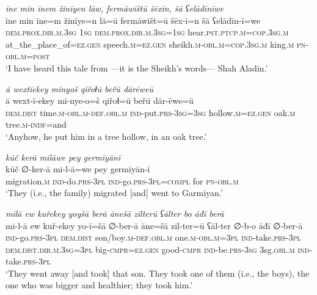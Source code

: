 \ea \label{ZB.37}
\textit{īne min īnem žinīyen lāw, fermāwištū šēxīn, šā ʕelādīnīwe} \\ 
\gll īne min īne=m žinīye=n lā=ū fermāwišt=ū šēx-ī=n šā ʕelādīn-ī=we \\ 
 \textsc{dem.prox}\textsc{.dir}\textsc{.m}\textsc{.3sg} \textsc{1sg} \textsc{dem.prox}\textsc{.dir}\textsc{.m}\textsc{.3sg}\textsc{=\textsc{1sg}} hear\textsc{.pst}\textsc{.ptcp}\textsc{.m}\textsc{=cop}\textsc{.3sg}\textsc{.m} at\_the\_place\_of\textsc{\textsc{=ez.gen}} speech\textsc{.m}\textsc{\textsc{=ez.gen}} sheikh\textsc{.m}\textsc{-obl}\textsc{.m}\textsc{=cop}\textsc{.3sg}\textsc{.m} king\textsc{.m} \textsc{pn}\textsc{-obl}\textsc{.m}\textsc{=\textsc{post}} \\ 
\glt `I have heard this tale from —it is the Sheikh’s words— Shah Aladin.'
\z 
 
\ea \label{ZB.38}
\textit{ā wextīekey minyoš qiřoɫū beřū dārēweū} \\ 
\gll ā wext-ī-ekey mi-nye-o=š qiřoɫ=ū beřū dār-ēwe=ū \\ 
 \textsc{dem.dist} time\textsc{.m}\textsc{-obl}\textsc{.m}\textsc{-def}\textsc{.obl}\textsc{.m} \textsc{ind-}put\textsc{.prs}\textsc{-3sg}\textsc{=3sg} hollow\textsc{.m}\textsc{\textsc{=ez.gen}} oak\textsc{.m} tree\textsc{.m}\textsc{-indf}=and \\ 
\glt `Anyhow, he put him in a tree hollow, in an oak tree.'
\z 
 
\ea \label{ZB.39}
\textit{kūč kerā milāwe pey germīyānī} \\ 
\gll kūč ∅-ker-ā mi-l-ā=we pey germīyān-ī \\ 
 migration\textsc{.m} \textsc{ind-}do\textsc{.prs}\textsc{-3pl} \textsc{ind-}go\textsc{.prs}\textsc{-3pl}\textsc{=compl} for \textsc{pn}\textsc{-obl}\textsc{.m} \\ 
\glt `They (i.e., the family) migrated [and] went to Garmiyan.'
\z 
 
\ea \label{ZB.40}
\textit{milā ew kuřekey yoyšā berā ānešā zilterū ʕālter bo āđī berā} \\ 
\gll mi-l-ā ew kuř-ekey yo-ī=šā ∅-ber-ā āne=šā zil-ter=ū ʕāl-ter ∅-b-o āđī ∅-ber-ā \\ 
 \textsc{ind-}go\textsc{.prs}\textsc{-3pl} \textsc{dem.dist} son/boy\textsc{.m}\textsc{-def}\textsc{.obl}\textsc{.m} one\textsc{.m}\textsc{-obl}\textsc{.m}\textsc{=3pl} \textsc{ind-}take\textsc{.prs}\textsc{-3pl} \textsc{dem.dist}\textsc{.dir}\textsc{.m}\textsc{.3sg}\textsc{=3pl} big\textsc{-cmpr}\textsc{\textsc{=ez.gen}} good\textsc{-cmpr} \textsc{ind-}be\textsc{.prs}\textsc{-3sg} 3sg\textsc{.obl}\textsc{.m} \textsc{ind-}take\textsc{.prs}\textsc{-3pl} \\ 
\glt `They went away [and took] that son. They took one of them (i.e., the boys), the one who was bigger and healthier; they took him.'
\z 
 
